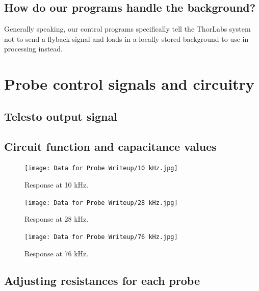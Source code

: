 \documentclass{article}
\begin{document}
\subsection{How do our programs handle the background?}

\par{Generally speaking, our control programs specifically tell the ThorLabs system not to send a flyback signal and loads in a locally stored background to use in processing instead.}

\section{Probe control signals and circuitry}\label{circsection}
\hypertarget{circsection}{}

\par{}

\subsection{Telesto output signal}

\par{}

\subsection{Circuit function and capacitance values}

\par{}

\begin{figure}[!h]
	\centering
	\texttt{[image: Data for Probe Writeup/10 kHz.jpg]}
	\caption{Response at 10 kHz.}
\end{figure}

\begin{figure}[!h]
	\centering
	\texttt{[image: Data for Probe Writeup/28 kHz.jpg]}
	\caption{Response at 28 kHz.}
\end{figure}

\begin{figure}[!h]
	\centering
	\texttt{[image: Data for Probe Writeup/76 kHz.jpg]}
	\caption{Response at 76 kHz.}
\end{figure}

\subsection{Adjusting resistances for each probe}

\par{}
\end{document}
